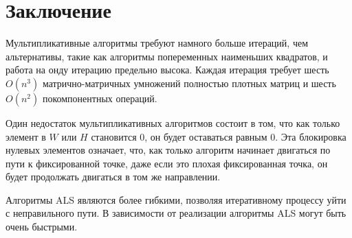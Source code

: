 
\newpage
\section{Заключение}


Мультипликативные алгоритмы требуют намного больше итераций, чем альтернативы, такие как алгоритмы попеременных наименьших квадратов, и работа на онду итерацию предельно высока. Каждая итерация требует шесть $O(n^3)$ матрично-матричных умножений полностью плотных матриц и шесть
$O (n^2)$ покомпонентных операций.

Один недостаток мультипликативных алгоритмов состоит в том, что как только элемент в $W$ или $H$ становится 0, он будет оставаться равным 0. Эта блокировка нулевых элементов означает, что, как только алгоритм начинает двигаться по пути к фиксированной точке, даже если это плохая фиксированная точка, он будет продолжать двигаться в том же направлении.

Алгоритмы ALS являются более гибкими, позволяя итеративному процессу уйти с неправильного пути. В зависимости от реализации алгоритмы ALS могут быть очень быстрыми.
